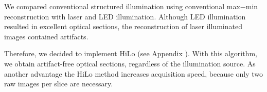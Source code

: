 We compared conventional structured illumination using conventional max$-$min
reconstruction with laser and LED illumination. Although LED
illumination resulted in excellent optical sections, the
reconstruction of laser illuminated images contained artifacts.


Therefore, we decided to implement HiLo (see Appendix \label{ref:sectioning}). With
this algorithm, we obtain artifact-free optical sections, regardless
of the illumination source. As another advantage the HiLo method
increases acquisition speed, because only two raw images per slice are
necessary.



     







